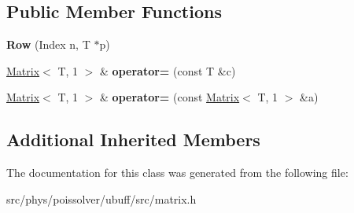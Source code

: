 \subsection*{Public Member Functions}
\begin{DoxyCompactItemize}
\item 
{\bfseries Row} (Index n, T $\ast$p)\hypertarget{classcpt_1_1Row_3_01T_00_011_01_4_a6a903b68185a2e5c1fd6e984870bee7e}{}\label{classcpt_1_1Row_3_01T_00_011_01_4_a6a903b68185a2e5c1fd6e984870bee7e}

\item 
\hyperlink{classcpt_1_1Matrix}{Matrix}$<$ T, 1 $>$ \& {\bfseries operator=} (const T \&c)\hypertarget{classcpt_1_1Row_3_01T_00_011_01_4_a9ea6d29612640f587d5e3c2bb102ef9f}{}\label{classcpt_1_1Row_3_01T_00_011_01_4_a9ea6d29612640f587d5e3c2bb102ef9f}

\item 
\hyperlink{classcpt_1_1Matrix}{Matrix}$<$ T, 1 $>$ \& {\bfseries operator=} (const \hyperlink{classcpt_1_1Matrix}{Matrix}$<$ T, 1 $>$ \&a)\hypertarget{classcpt_1_1Row_3_01T_00_011_01_4_a6c470fd6ee60fff6aa4b5a0df295c25b}{}\label{classcpt_1_1Row_3_01T_00_011_01_4_a6c470fd6ee60fff6aa4b5a0df295c25b}

\end{DoxyCompactItemize}
\subsection*{Additional Inherited Members}


The documentation for this class was generated from the following file\+:\begin{DoxyCompactItemize}
\item 
src/phys/poissolver/ubuff/src/matrix.\+h\end{DoxyCompactItemize}
